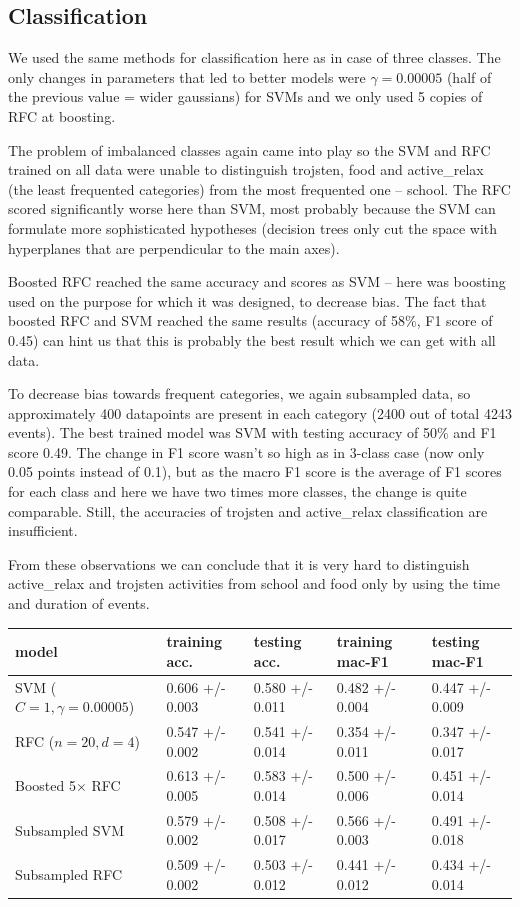 \documentclass[a4paper, 12pt]{article}
\begin{document}
\subsection{Classification}
We used the same methods for classification here as in case of three classes.
The only changes in parameters that led to better models were $\gamma = 0.00005$
(half of the previous value = wider gaussians) for SVMs and we only 
used 5 copies of RFC at boosting.

The problem of imbalanced classes again came into play so the SVM and RFC
trained on all data were unable to distinguish trojsten, food and active\_relax
(the least frequented categories) from the most frequented one -- school.
The RFC scored significantly worse here than SVM, most probably because the SVM
can formulate more sophisticated hypotheses (decision trees only cut the space
with hyperplanes that are perpendicular to the main axes).

Boosted RFC reached the same accuracy and scores as SVM -- here was boosting
used on the purpose for which it was designed, to decrease bias. The fact
that boosted RFC and SVM reached the same results (accuracy of 58\%, F1 score of 0.45) 
can hint us that this is probably the best result which we can get with all data.

To decrease bias towards frequent categories, we again subsampled data, so approximately
400 datapoints are present in each category (2400 out of total 4243 events).
The best trained model was SVM with testing accuracy of 50\% and F1 score 0.49.
The change in F1 score wasn't so high as in 3-class case (now only 0.05 points 
instead of 0.1), but as the macro F1 score is the average of F1 scores for each
class and here we have two times more classes, the change is quite comparable.
Still, the accuracies of trojsten and active\_relax classification are insufficient.

From these observations we can conclude that it is very hard to distinguish
active\_relax and trojsten activities from school and food only by using the
time and duration of events.


\begin{table}[h!]
\centering
\begin{tabular}{ l l l l l }
model & training acc. & testing acc. & training mac-F1 & testing mac-F1 \\  \hline 
SVM ($C=1, \gamma=0.00005$) & 0.606 +/- 0.003 & 0.580 +/- 0.011 & 0.482 +/- 0.004 & 0.447 +/- 0.009 \\
RFC ($n=20, d=4$) & 0.547 +/- 0.002 & 0.541 +/- 0.014 & 0.354 +/- 0.011 & 0.347 +/- 0.017 \\
Boosted 5$\times$ RFC & 0.613 +/- 0.005 & 0.583 +/- 0.014 & 0.500 +/- 0.006 & 0.451 +/- 0.014 \\
Subsampled SVM & 0.579 +/- 0.002 & 0.508 +/- 0.017 & 0.566 +/- 0.003 & 0.491 +/- 0.018 \\
Subsampled RFC & 0.509 +/- 0.002 & 0.503 +/- 0.012 & 0.441 +/- 0.012 & 0.434 +/- 0.014
\end{tabular}
\end{table}
\end{document}
